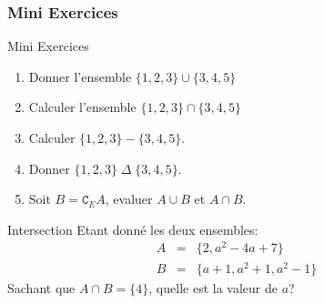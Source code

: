 \documentclass{beamer}
\begin{document}
\begin{frame}[t]
  \frametitle{Mini Exercices}
 \small 
  \begin{block}{Mini Exercices}
    \begin{enumerate}
      \item Donner l'ensemble $\{1,2,3\}\cup \{3,4,5\}$
      \item Calculer l'ensemble $\{1,2,3\}\cap \{3,4,5\}$
      \item Calculer $\{1,2,3\} - \{3,4,5\}$.
      \item Donner $\{1,2,3\}\; \Delta\; \{3,4,5\}$.
      \item Soit $ B = \mathtt{C}_E A$, evaluer $A\cup B$ et $A\cap B$.
    \end{enumerate}
  \end{block}
  \begin{block}{Intersection}
  Etant donné les deux ensembles:
  \begin{eqnarray*}
    A& = & \{2, a^2 - 4a + 7\} \\
    B& = & \{a+1, a^2+1, a^2-1\}
  \end{eqnarray*}
  Sachant que $A \cap B = \{4\}$, quelle est la valeur de $a$?
  \end{block}
\end{frame}



\end{document}
